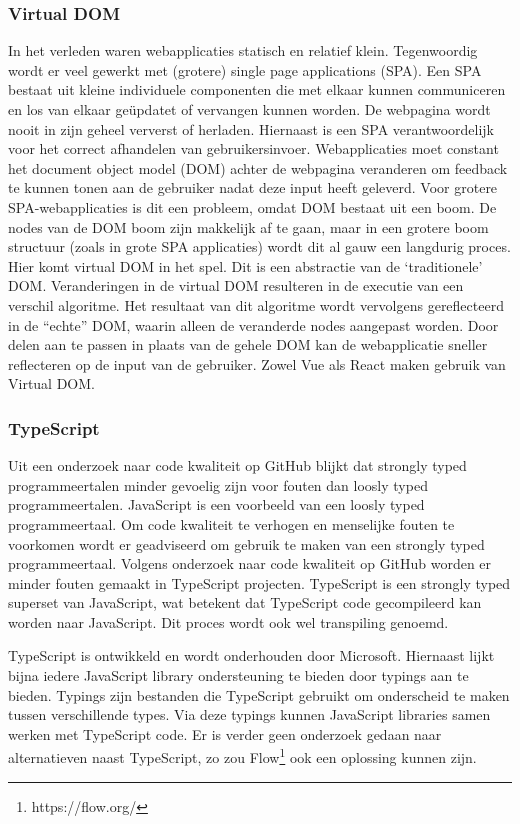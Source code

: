 \subsubsection{Virtual DOM}
In het verleden waren webapplicaties statisch en relatief klein. Tegenwoordig wordt er veel gewerkt met (grotere) single page applications (SPA). Een SPA bestaat uit kleine individuele componenten die met elkaar kunnen communiceren en los van elkaar geüpdatet of vervangen kunnen worden\cite{SPA}. De webpagina wordt nooit in zijn geheel ververst of herladen. Hiernaast is een SPA verantwoordelijk voor het correct afhandelen van gebruikersinvoer.
Webapplicaties moet constant het document object model (DOM) achter de webpagina veranderen om feedback te kunnen tonen aan de gebruiker nadat deze input heeft geleverd. Voor grotere SPA-webapplicaties is dit een probleem, omdat DOM bestaat uit een boom. De nodes van de DOM boom zijn makkelijk af te gaan, maar in een grotere boom structuur (zoals in grote SPA applicaties) wordt dit al gauw een langdurig proces.
Hier komt virtual DOM in het spel. Dit is een abstractie van de ‘traditionele’ DOM\cite{Psaila2008}. Veranderingen in de virtual DOM resulteren in de executie van een verschil algoritme. Het resultaat van dit algoritme wordt vervolgens gereflecteerd in de “echte” DOM, waarin alleen de veranderde nodes aangepast worden. Door delen aan te passen in plaats van de gehele DOM kan de webapplicatie sneller reflecteren op de input van de gebruiker.
Zowel Vue als React maken gebruik van Virtual DOM.

\subsubsection{TypeScript}
Uit een onderzoek naar code kwaliteit op GitHub blijkt dat strongly typed programmeertalen minder gevoelig zijn voor fouten dan loosly typed programmeertalen\cite{Ray2014}. JavaScript is een voorbeeld van een loosly typed programmeertaal. Om code kwaliteit te verhogen en menselijke fouten te voorkomen wordt er geadviseerd om gebruik te maken van een strongly typed programmeertaal. Volgens onderzoek naar code kwaliteit op GitHub worden er minder fouten gemaakt in TypeScript projecten\cite{Ray2014}. TypeScript is een strongly typed superset van JavaScript, wat betekent dat TypeScript code gecompileerd kan worden naar JavaScript. Dit proces wordt ook wel transpiling genoemd.

TypeScript is ontwikkeld en wordt onderhouden door Microsoft. Hiernaast lijkt bijna iedere JavaScript library ondersteuning te bieden door typings aan te bieden. Typings zijn bestanden die TypeScript gebruikt om onderscheid te maken tussen verschillende types. Via deze typings kunnen JavaScript libraries samen werken met TypeScript code. 
Er is verder geen onderzoek gedaan naar alternatieven naast TypeScript, zo zou Flow\footnote{https://flow.org/} ook een oplossing kunnen zijn.

